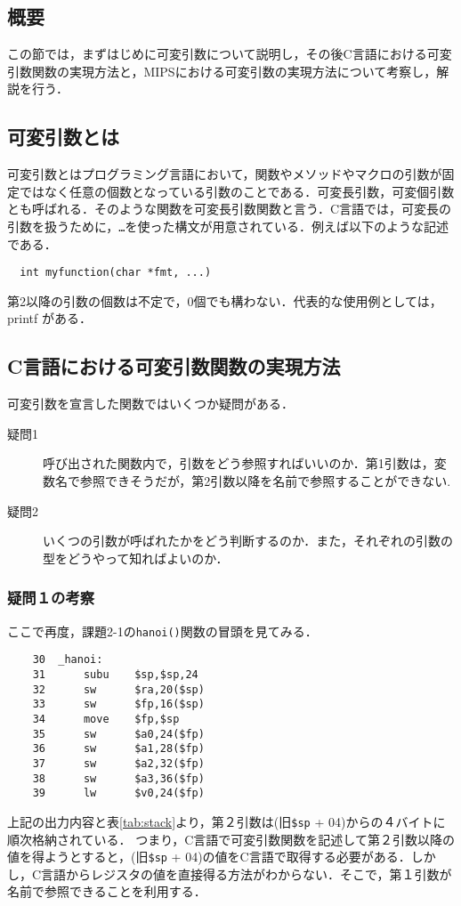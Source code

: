 \documentclass[a4j,11pt]{jarticle}
\begin{document}
  \subsection{概要}
  この節では，まずはじめに可変引数について説明し，その後C言語における可変引数関数の実現方法と，MIPSにおける可変引数の実現方法について考察し，解説を行う．

  \subsection{可変引数とは}\label{sec:kahentoha}
  可変引数とはプログラミング言語において，関数やメソッドやマクロの引数が固定ではなく任意の個数となっている引数のことである．可変長引数，可変個引数とも呼ばれる．そのような関数を可変長引数関数と言う．C言語では，可変長の引数を扱うために，\verb|…|を使った構文が用意されている．例えば以下のような記述である．
  \begin{verbatim}
  int myfunction(char *fmt, ...)
  \end{verbatim}
  第2以降の引数の個数は不定で，0個でも構わない．代表的な使用例としては，printf がある．

  \subsection{C言語における可変引数関数の実現方法}
  可変引数を宣言した関数ではいくつか疑問がある．
  \begin{description}
  \item[疑問1] 呼び出された関数内で，引数をどう参照すればいいのか．第1引数は，変数名で参照できそうだが，第2引数以降を名前で参照することができない.
  \item[疑問2] いくつの引数が呼ばれたかをどう判断するのか．また，それぞれの引数の型をどうやって知ればよいのか．
  \end{description}
  \subsubsection{疑問１の考察}
  ここで再度，課題2-1の\verb|hanoi()|関数の冒頭を見てみる．
  \begin{verbatim}
    30	_hanoi:
    31		subu	$sp,$sp,24
    32		sw	    $ra,20($sp)
    33		sw	    $fp,16($sp)
    34		move	$fp,$sp
    35		sw	    $a0,24($fp)
    36		sw	    $a1,28($fp)
    37		sw	    $a2,32($fp)
    38		sw	    $a3,36($fp)
    39		lw	    $v0,24($fp)
  \end{verbatim}
  上記の出力内容と表\ref{tab:stack}より，第２引数は(旧\verb|$sp| + 04)からの４バイトに順次格納されている．
  つまり，C言語で可変引数関数を記述して第２引数以降の値を得ようとすると，(旧\verb|$sp| + 04)の値をC言語で取得する必要がある．しかし，C言語からレジスタの値を直接得る方法がわからない．そこで，第１引数が名前で参照できることを利用する．
\end{document}
